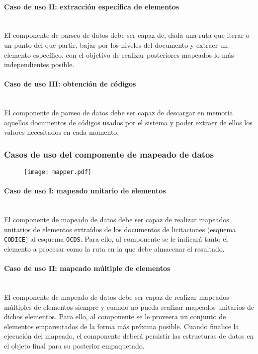             \paragraph{Caso de uso II: extracción específica de elementos} \mbox{}\\
                El componente de parseo de datos debe ser capaz de, dada una ruta que iterar o un punto del que partir, bajar por los niveles del documento y extraer un elemento específico, con el objetivo de realizar posteriores mapeados lo más independientes posible.
            
            \paragraph{Caso de uso III: obtención de códigos} \mbox{}\\
                El componente de parseo de datos debe ser capaz de descargar en memoria aquellos documentos de códigos usados por el sistema y poder extraer de ellos los valores necesitados en cada momento.
\newpage
        \subsubsection{Casos de uso del componente de mapeado de datos}
    
            \begin{figure}[h]
                \centering
                \texttt{[image: mapper.pdf]}
                \label{fig:mapper}
            \end{figure}
            
            \paragraph{Caso de uso I: mapeado unitario de elementos} \mbox{}\\
                El componente de mapeado de datos debe ser capaz de realizar mapeados unitarios de elementos extraídos de los documentos de licitaciones (esquema \texttt{CODICE}) al esquema \texttt{OCDS}. Para ello, al componente se le indicará tanto el elemento a procesar como la ruta en la que debe almacenar el resultado.
                
            \paragraph{Caso de uso II: mapeado múltiple de elementos} \mbox{}\\
                El componente de mapeado de datos debe ser capaz de realizar mapeados múltiples de elementos siempre y cuando no pueda realizar mapeados unitarios de dichos elementos. Para ello, al componente se le proveera un conjunto de elementos emparentados de la forma más próxima posible. Cuando finalice la ejecución del mapeado, el componente deberá persistir las estructuras de datos en el objeto final para su posterior empaquetado.
                
